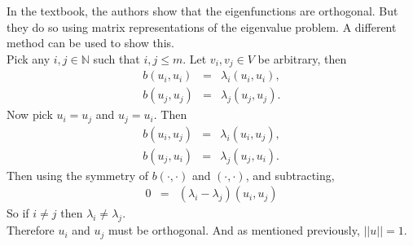 \documentclass[../../main.tex]{subfiles}
\begin{document}
In the textbook, the authors show that the eigenfunctions are orthogonal. But they do so using matrix representations of the eigenvalue problem. A different method can be used to show this.\\

Pick any $i,j \in \mathbb{N}$ such that $i,j \leq m$. Let $v_{i},v_{j} \in V$ be arbitrary, then
\begin{eqnarray*}
	b(u_{i},u_{i}) &=& \lambda_{i}( u_{i},u_{i}),\\
	b(u_{j},u_{j}) &=& \lambda_{j}( u_{j},u_{j}).
\end{eqnarray*}
Now pick $u_{i} = u_{j}$ and $u_{j} = u_{i}$. Then
\begin{eqnarray*}
	b(u_{i},u_{j}) &=& \lambda_{i}( u_{i},u_{j}),\\
	b(u_{j},u_{i}) &=& \lambda_{j}( u_{j},u_{i}).
\end{eqnarray*}
Then using the symmetry of $b(\cdot,\cdot)$ and $( \cdot, \cdot )$, and subtracting,
\begin{eqnarray*}
	0 &=& (\lambda_{i} - \lambda_{j})( u_{i}, u_{j} )
\end{eqnarray*}
So if $i \neq j$ then $\lambda_{i} \neq \lambda_{j}$.\\

Therefore $u_{i}$ and $u_{j}$ must be orthogonal. And as mentioned previously, $||u|| = 1$.
\end{document}
